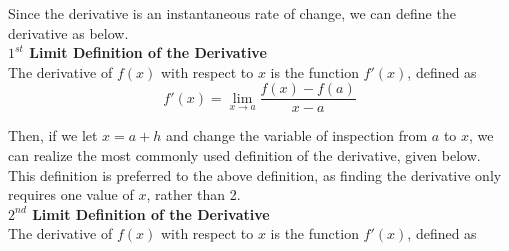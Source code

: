         \begin{center}
        \end{center}

        \noindent Since the derivative is an instantaneous rate of change, we can define the
        derivative as below. \\
        \color{purple} \textbf{$1^{st}$ Limit Definition of the Derivative} \color{black} \\
        The derivative of $f(x)$ with respect to $x$ is the function $f'(x)$, defined as \\

        \begin{equation*}
            f'(x) = \lim_{x\to a} \frac{f(x)-f(a)}{x-a}
        \end{equation*}

        \noindent Then, if we let $x=a+h$ and change the variable of inspection from $a$ to $x$,
        we can realize the most commonly used definition of the derivative, given below. This
        definition is preferred to the above definition, as finding the derivative only requires
        one value of $x$, rather than 2.  \\
        \color{purple} \textbf{$2^{nd}$ Limit Definition of the Derivative} \color{black} \\
        The derivative of $f(x)$ with respect to $x$ is the function $f'(x)$, defined as \\

